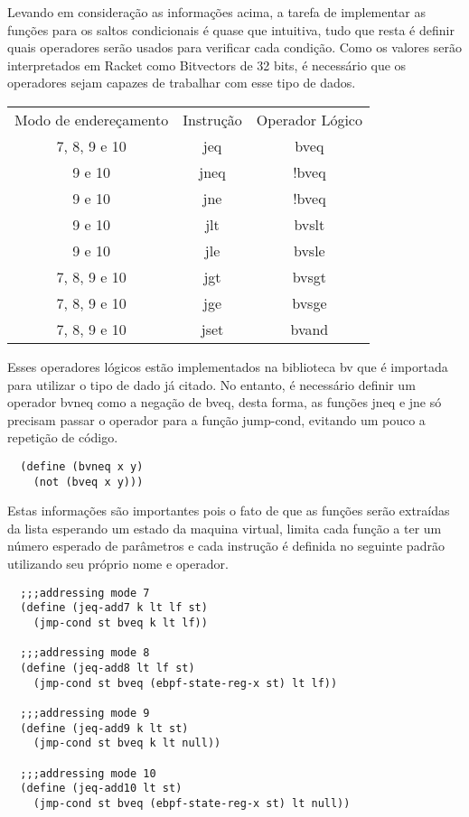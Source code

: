 \documentclass[paper=a4, fontsize=12pt]{article}
\theoremstyle{definition}
\begin{document}
Levando em consideração as informações acima, a tarefa de implementar as funções para os saltos condicionais é quase
que intuitiva, tudo que resta é definir quais operadores serão usados para verificar cada condição. Como os valores
serão interpretados em Racket como Bitvectors de 32 bits, é necessário que os operadores sejam capazes de trabalhar
com esse tipo de dados.

\begin{center}
\begin{tabular}{ c c c }
  Modo de endereçamento & Instrução & Operador Lógico\\
  7, 8, 9 e 10          & jeq       & bveq\\
  9 e 10                & jneq      & !bveq\\
  9 e 10                & jne       & !bveq\\
  9 e 10                & jlt       & bvslt\\
  9 e 10                & jle       & bvsle\\
  7, 8, 9 e 10          & jgt       & bvsgt\\
  7, 8, 9 e 10          & jge       & bvsge\\
  7, 8, 9 e 10          & jset      & bvand\\
\end{tabular}
\end{center}

Esses operadores lógicos estão implementados na biblioteca bv que é importada para utilizar o tipo de dado
já citado. No entanto, é necessário definir um operador bvneq como a negação de bveq, desta forma, as funções
jneq e jne só precisam passar o operador para a função jump-cond, evitando um pouco a repetição de código. 

\begin{lstlisting}
  (define (bvneq x y)
    (not (bveq x y)))
\end{lstlisting}

Estas informações são importantes pois o fato de que as funções serão extraídas da lista esperando um estado
da maquina virtual, limita cada função a ter um número esperado de parâmetros e cada instrução é definida no
seguinte padrão utilizando seu próprio nome e operador.

\begin{lstlisting}
  ;;;addressing mode 7
  (define (jeq-add7 k lt lf st)
    (jmp-cond st bveq k lt lf))

  ;;;addressing mode 8
  (define (jeq-add8 lt lf st)
    (jmp-cond st bveq (ebpf-state-reg-x st) lt lf))

  ;;;addressing mode 9
  (define (jeq-add9 k lt st)
    (jmp-cond st bveq k lt null))

  ;;;addressing mode 10
  (define (jeq-add10 lt st)
    (jmp-cond st bveq (ebpf-state-reg-x st) lt null))
\end{lstlisting}
\end{document}
